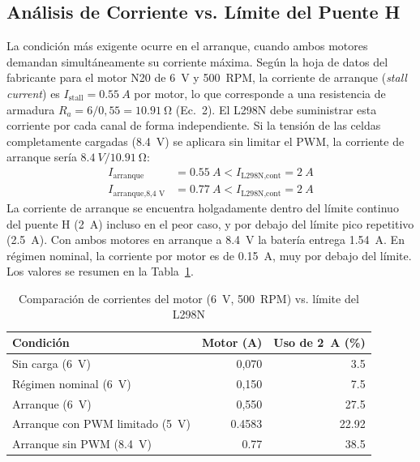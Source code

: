 \documentclass[conference]{IEEEtran}
\newcommand{\valArmatureResistance}{10.91}
\newcommand{\valStallFullA}{0.77}
\newcommand{\valStallLimitedA}{0.4583}
\newcommand{\valStallTotalFullA}{1.54}
\newcommand{\valNoLoadUsePct}{3.5}
\newcommand{\valRatedUsePct}{7.5}
\newcommand{\valStallUsePct}{27.5}
\newcommand{\valStallFullUsePct}{38.5}
\newcommand{\valStallLimitedUsePct}{22.92}
\begin{document}
\subsection{Análisis de Corriente vs. Límite del Puente H}
La condición más exigente ocurre en el arranque, cuando ambos motores demandan simultáneamente su corriente máxima. Según la hoja de datos del fabricante \cite{foneacc} para el motor N20 de \SI{6}{V} y \SI{500}{RPM}, la corriente de arranque (\emph{stall current}) es $I_{\text{stall}} = \SI{0.55}{A}$ por motor, lo que corresponde a una resistencia de armadura $R_a = 6/0{,}55 = \SI{\valArmatureResistance}{\ohm}$ (Ec.~2). El L298N debe suministrar esta corriente por cada canal de forma independiente. Si la tensión de las celdas completamente cargadas (\SI{8.4}{V}) se aplicara sin limitar el PWM, la corriente de arranque sería $\SI{8.4}{V}/\SI{\valArmatureResistance}{\ohm}$:
\begin{equation}
\begin{aligned}
I_{\text{arranque}} &= \SI{0.55}{A} < I_{\text{L298N,cont}} = \SI{2}{A}\\
I_{\text{arranque,8,4 V}} &= \SI{\valStallFullA}{A} < I_{\text{L298N,cont}} = \SI{2}{A}
\end{aligned}
\end{equation}
La corriente de arranque se encuentra holgadamente dentro del límite continuo del puente H (\SI{2}{A}) incluso en el peor caso, y por debajo del límite pico repetitivo (\SI{2.5}{A}). Con ambos motores en arranque a \SI{8.4}{V} la batería entrega \SI{\valStallTotalFullA}{A}. En régimen nominal, la corriente por motor es de \SI{0.15}{A}, muy por debajo del límite. Los valores se resumen en la Tabla~\ref{tab:corrientes}.

\begin{table}[!t]
\caption{Comparación de corrientes del motor (\SI{6}{V}, \SI{500}{RPM}) vs. límite del L298N}
\label{tab:corrientes}
\centering
\begin{tabular}{@{}lrr@{}}
\toprule
Condición & Motor (A) & Uso de \SI{2}{A} (\%) \\
\midrule
Sin carga (\SI{6}{V}) & 0,070 & \num{\valNoLoadUsePct} \\
Régimen nominal (\SI{6}{V}) & 0,150 & \num{\valRatedUsePct} \\
Arranque (\SI{6}{V}) & 0,550 & \num{\valStallUsePct} \\
Arranque con PWM limitado (\SI{5}{V}) & \num[round-mode=places,round-precision=3]{\valStallLimitedA} & \num[round-mode=places,round-precision=1]{\valStallLimitedUsePct} \\
Arranque sin PWM (\SI{8.4}{V}) & \num[round-mode=places,round-precision=3]{\valStallFullA} & \num[round-mode=places,round-precision=1]{\valStallFullUsePct} \\
\bottomrule
\end{tabular}
\end{table}
\end{document}
